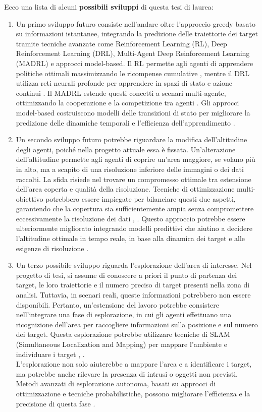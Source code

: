 \documentclass[twoside]{article}
\begin{document}
Ecco una lista di alcuni \textbf{possibili sviluppi} di questa tesi di laurea:
\begin{enumerate}
    \item Un primo sviluppo futuro consiste nell'andare oltre l'approccio greedy basato su informazioni istantanee, integrando la predizione delle traiettorie dei target tramite tecniche avanzate come Reinforcement Learning (RL), Deep Reinforcement Learning (DRL), Multi-Agent Deep Reinforcement Learning (MADRL) e approcci model-based. Il RL permette agli agenti di apprendere politiche ottimali massimizzando le ricompense cumulative \cite{SuttonBarto2018}, mentre il DRL utilizza reti neurali profonde per apprendere in spazi di stato e azione continui \cite{Mnih2015}. Il MADRL estende questi concetti a scenari multi-agente, ottimizzando la cooperazione e la competizione tra agenti \cite{Lowe2017}. Gli approcci model-based costruiscono modelli delle transizioni di stato per migliorare la predizione delle dinamiche temporali e l'efficienza dell'apprendimento \cite{Chua2018}.
    
    \item Un secondo sviluppo futuro potrebbe riguardare la modifica dell'altitudine degli agenti, poiché nella progetto attuale essa è fissata. Un'alterazione dell'altitudine permette agli agenti di coprire un'area maggiore, se volano più in alto, ma a scapito di una risoluzione inferiore delle immagini o dei dati raccolti. La sfida risiede nel trovare un compromesso ottimale tra estensione dell'area coperta e qualità della risoluzione. Tecniche di ottimizzazione multi-obiettivo potrebbero essere impiegate per bilanciare questi due aspetti, garantendo che la copertura sia sufficientemente ampia senza compromettere eccessivamente la risoluzione dei dati \cite{Zhao2019}, \cite{Beard2020}. Questo approccio potrebbe essere ulteriormente migliorato integrando modelli predittivi che aiutino a decidere l'altitudine ottimale in tempo reale, in base alla dinamica dei target e alle esigenze di risoluzione \cite{Merino2006}.
    
    \item Un terzo possibile sviluppo riguarda l'esplorazione dell'area di interesse. Nel progetto di tesi, si assume di conoscere a priori il punto di partenza dei target, le loro traiettorie e il numero preciso di target presenti nella zona di analisi. Tuttavia, in scenari reali, queste informazioni potrebbero non essere disponibili. Pertanto, un'estensione del lavoro potrebbe consistere nell'integrare una fase di esplorazione, in cui gli agenti effettuano una ricognizione dell'area per raccogliere informazioni sulla posizione e sul numero dei target. Questa esplorazione potrebbe utilizzare tecniche di SLAM (Simultaneous Localization and Mapping) per mappare l'ambiente e individuare i target \cite{Thrun2005}, \cite{Cadena2016}.\\
    L'esplorazione non solo aiuterebbe a mappare l'area e a identificare i target, ma potrebbe anche rilevare la presenza di intrusi o oggetti non previsti. Metodi avanzati di esplorazione autonoma, basati su approcci di ottimizzazione e tecniche probabilistiche, possono migliorare l'efficienza e la precisione di questa fase \cite{Bircher2016}.
\end{enumerate}
\end{document}
